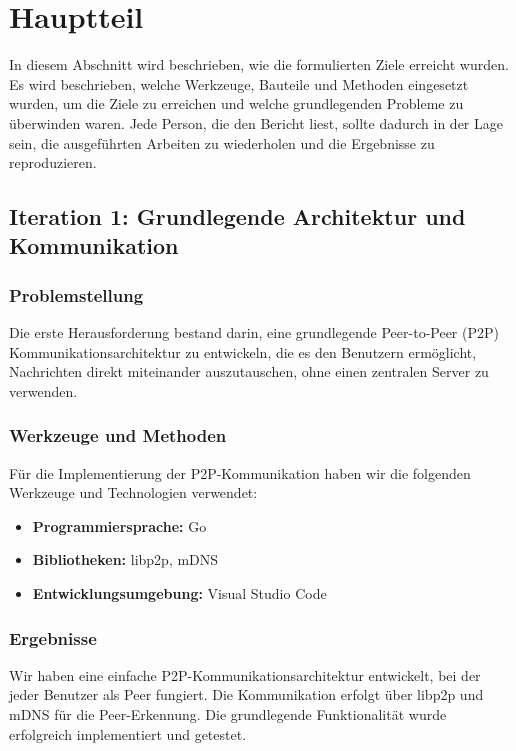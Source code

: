 \section{Hauptteil}

In diesem Abschnitt wird beschrieben, wie die formulierten Ziele erreicht wurden. 
Es wird beschrieben, welche Werkzeuge, Bauteile und Methoden eingesetzt wurden, um die Ziele zu erreichen und welche grundlegenden Probleme zu überwinden waren. 
Jede Person, die den Bericht liest, sollte dadurch in der Lage sein, die ausgeführten Arbeiten zu wiederholen und die Ergebnisse zu reproduzieren.

\subsection{Iteration 1: Grundlegende Architektur und Kommunikation}

\subsubsection{Problemstellung}
Die erste Herausforderung bestand darin, eine grundlegende Peer-to-Peer (P2P) Kommunikationsarchitektur zu entwickeln, die es den Benutzern ermöglicht, Nachrichten direkt miteinander auszutauschen, ohne einen zentralen Server zu verwenden.

\subsubsection{Werkzeuge und Methoden}
Für die Implementierung der P2P-Kommunikation haben wir die folgenden Werkzeuge und Technologien verwendet:
\begin{itemize}
    \item \textbf{Programmiersprache:} Go
    \item \textbf{Bibliotheken:} libp2p, mDNS
    \item \textbf{Entwicklungsumgebung:} Visual Studio Code
\end{itemize}

\subsubsection{Ergebnisse}
Wir haben eine einfache P2P-Kommunikationsarchitektur entwickelt, bei der jeder Benutzer als Peer fungiert. Die Kommunikation erfolgt über libp2p und mDNS für die Peer-Erkennung. Die grundlegende Funktionalität wurde erfolgreich implementiert und getestet.

